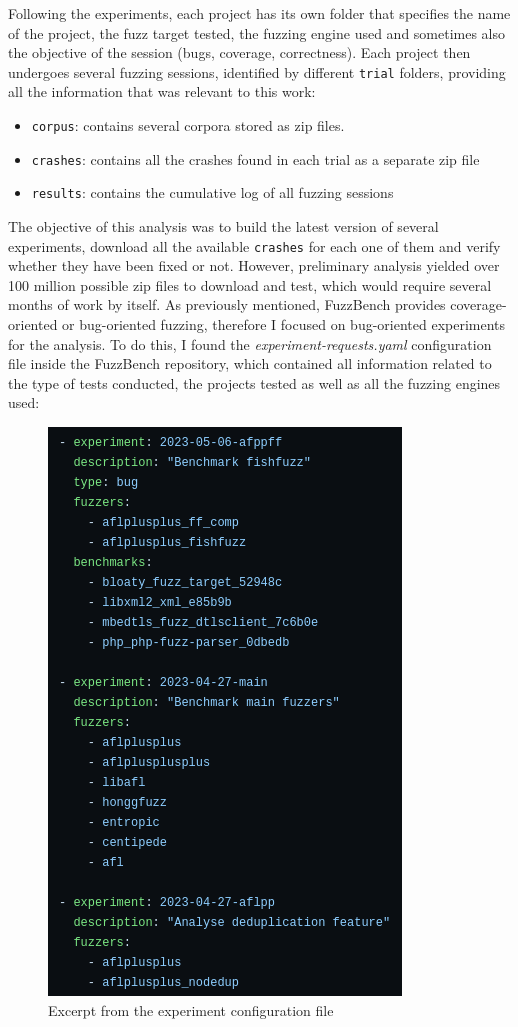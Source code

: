 Following the experiments, each project has its own folder that specifies the name of the project, the fuzz target tested, the fuzzing engine used and sometimes also the objective of the session (bugs, coverage, correctness). Each project then undergoes several fuzzing sessions, identified by different \verb|trial| folders, providing all the information that was relevant to this work:
\begin{itemize}
    \item \verb|corpus|: contains several corpora stored as zip files.
    \item \verb|crashes|: contains all the crashes found in each trial as a separate zip file
    \item \verb|results|: contains the cumulative log of all fuzzing sessions
\end{itemize}


The objective of this analysis was to build the latest version of several experiments, download all the available \verb|crashes| for each one of them and verify whether they have been fixed or not. However, preliminary analysis yielded over 100 million possible zip files to download and test, which would require several months of work by itself. 
As previously mentioned, FuzzBench provides coverage-oriented or bug-oriented fuzzing, therefore I focused on bug-oriented experiments for the analysis. To do this, I found the \textit{experiment-requests.yaml} configuration file \cite{exp_yaml} inside the FuzzBench repository, which contained all information related to the type of tests conducted, the projects tested as well as all the fuzzing engines used:

\begin{figure}[h]
\centering
\includegraphics[scale=0.58]{foto/exp_yaml.png}
\caption{Excerpt from the experiment configuration file}
\label{fig:exp_yaml}
\end{figure}

